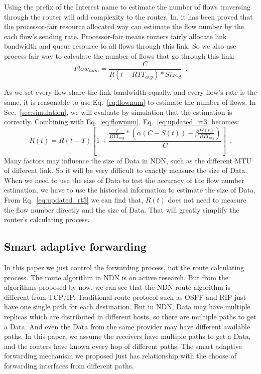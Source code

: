 Using the prefix of the Interest name to estimate the number of flows traversing through the router will add complexity to the router. In\cite{RCP}, it has been proved that the processor-fair resource allocated way can estimate the flow number by the each flow's sending rate. Processor-fair means routers fairly allocate link bandwidth and queue resource to all flows through this link. So we also use process-fair way to calculate the number of flows that go through this link:
\begin{equation}
	\label{eq:flownum}
	Flow_{num}=\frac{C}{R(t-RTT_{avg})\ast{Size_{d}}} \enspace .
\end{equation}

As we set every flow share the link bandwidth equally, and every flow's rate is the same, it is reasonable to use Eq.~\ref{eq:flownum} to estimate the number of flows. In Sec.~\ref{sec:simulation}, we will evaluate by simulation that the estimation is correctly.
Combining with Eq.~\ref{eq:flownum}, Eq.~\ref{eq:updated_rt3} becomes:
\begin{equation}
	\label{eq:updated_rt5}
	R(t)=R(t-T)[1+\frac{\frac{T}{RTT_{avg}}\ast(\alpha(C-S(t))-\beta\frac{Q(t)}{RTT_{avg}})}{C}] \enspace .
\end{equation}
Many factors may influence the size of Data in NDN, such as the different MTU of different link. So it will be very difficult to exactly measure the size of Data. When we need to use the size of Data to test the accuracy of the flow number estimation, we have to use the historical information to estimate the size of Data. From Eq.~\ref{eq:updated_rt5} we can find that, $R(t)$ does not need to measure the flow number directly and the size of Data. That will greatly simplify the router's calculating process.

\subsection{Smart adaptive forwarding}

In this paper we just control the forwarding process, not the route calculating process. The route algorithm in NDN is on active research. But from the algorithms proposed by now, we can see that the NDN route algorithm is different from TCP/IP\cite{ndnroute}. Traditional route protocol such as OSPF and RIP just have one single path for each destination. But in NDN, Data may have multiple replicas which are distributed in different hosts, so there are multiple paths to get a Data. And even the Data from the same provider may have different available paths. In this paper, we assume the receivers have multiple paths to get a Data, and the routers have known every hop of different paths. The smart adaptive forwarding mechanism we proposed just has relationship with the choose of forwarding interfaces from different paths.

